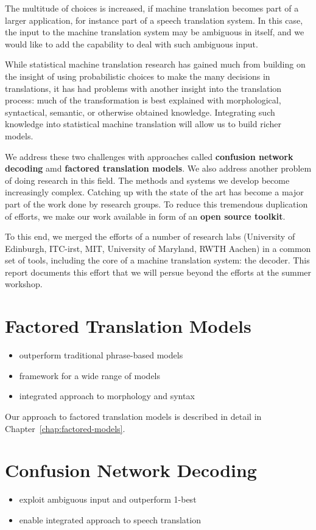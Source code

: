 \documentclass[11pt]{report}
\theoremstyle{plain}
\begin{document}
The multitude of choices is increased, if machine translation becomes part of a larger application, for instance part of a speech translation system. In this case, the input to the machine translation system may be ambiguous in itself, and we would like to add the capability to deal with such ambiguous input. 

While statistical machine translation research has gained much from building on the insight of using probabilistic choices to make the many decisions in translations, it has had problems with another insight into the translation process: much of the transformation is best explained with morphological, syntactical, semantic, or otherwise obtained knowledge. Integrating such knowledge into statistical machine translation will allow us to build richer models.

We address these two challenges with approaches called {\bf confusion network decoding} amd {\bf factored translation models}. We also address another problem of doing research in this field. The methods and systems we develop become increasingly complex. Catching up with the state of the art has become a major part of the work done by research groups. To reduce this tremendous duplication of efforts, we make our work available in form of an {\bf open source toolkit}.

To this end, we merged the efforts of a number of research labs (University of Edinburgh, ITC-irst, MIT, University of Maryland, RWTH Aachen) in a common set of tools, including the core of a machine translation system: the decoder. This report documents this effort that we will persue beyond the efforts at the summer workshop.

\section{Factored Translation Models}
{\sc \begin{itemize}
\item outperform traditional phrase-based models
\item framework for a wide range of models
\item integrated approach to morphology and syntax
\end{itemize}}

Our approach to factored translation models is described in detail in Chapter~\ref{chap:factored-models}.

\section{Confusion Network Decoding}
{\sc \begin{itemize}
\item exploit ambiguous input and outperform 1-best
\item enable integrated approach to speech translation
\end{itemize}}
\end{document}
